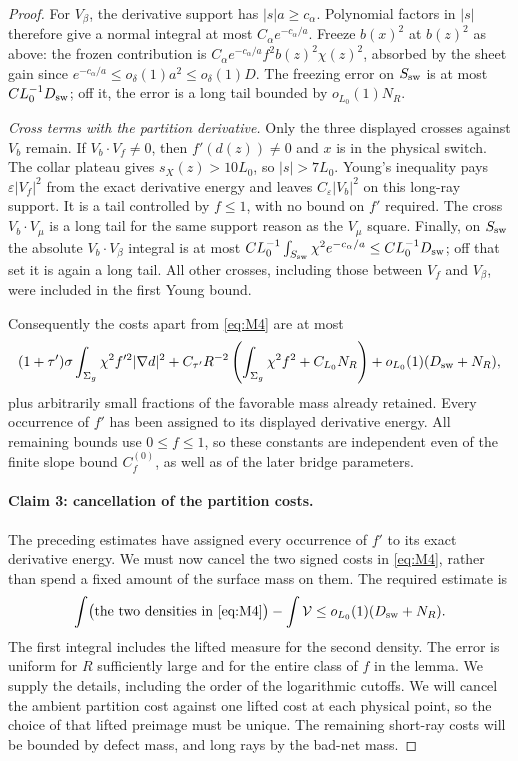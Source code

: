 \begin{proof}
For $V_\beta$, the derivative support has $|s|a\ge c_\alpha$.
Polynomial factors in $|s|$ therefore give a normal integral at most
$C_\alpha e^{-c_\alpha/a}$.  Freeze $b(x)^2$ at $b(z)^2$ as above:
the frozen contribution is
$C_\alpha e^{-c_\alpha/a}f^2b(z)^2\chi(z)^2$, absorbed by the sheet
gain since $e^{-c_\alpha/a}\le o_\delta(1)a^2\le o_\delta(1)D$.
The freezing error on $S_{\rm sw}$ is at most $C L_0^{-1}D_{\rm sw}$;
off it, the error is a long tail bounded by $o_{L_0}(1)N_R$.

\emph{Cross terms with the partition derivative.}
Only the three displayed crosses against $V_b$ remain.  If
$V_b\cdot V_f\ne0$, then $f'(d(z))\ne0$ and $x$ is in the physical
switch.  The collar plateau gives $s_X(z)>10L_0$, so $|s|>7L_0$.
Young's inequality pays $\varepsilon|V_f|^2$ from the exact derivative
energy and leaves $C_\varepsilon|V_b|^2$ on this long-ray support.
It is a tail controlled by $f\le1$, with no bound on $f'$ required.
The cross $V_b\cdot V_\mu$ is a long tail for the same support reason
as the $V_\mu$ square.  Finally, on $S_{\rm sw}$ the absolute
$V_b\cdot V_\beta$ integral is at most
$C L_0^{-1}\int_{S_{\rm sw}}\chi^2e^{-c_\alpha/a}
\le C L_0^{-1}D_{\rm sw}$; off that set it is again a long tail.
All other crosses, including those between $V_f$ and $V_\beta$, were
included in the first Young bound.

Consequently the costs apart from \eqref{eq:M4} are at most
\[
 (1+\tau')\sigma\int_{\Sigma_g}\chi^2f'^2|\nabla d|^2
 +C_{\tau'}R^{-2}
       \left(\int_{\Sigma_g}\chi^2f^2+C_{L_0}N_R\right)
 +o_{L_0}(1)(D_{\rm sw}+N_R),
\]
plus arbitrarily small fractions of the favorable mass already
retained.  Every occurrence of $f'$ has been assigned to its displayed
derivative energy.  All remaining bounds use $0\le f\le1$, so these
constants are independent even of the finite slope bound
$C_f^{(0)}$, as well as of the later bridge parameters.

\paragraph{Claim 3: cancellation of the partition costs.}
The preceding estimates have assigned every occurrence of $f'$ to its
exact derivative energy.  We must now cancel the two signed costs in
\eqref{eq:M4}, rather than spend a fixed amount of the surface mass on
them.  The required estimate is
\begin{equation}\label{eq:M5}
 \int\bigl(\hbox{the two densities in \eqref{eq:M4}}\bigr)
        -\int\mathcal V
 \le o_{L_0}(1)(D_{\rm sw}+N_R).
\end{equation}
The first integral includes the lifted measure for the second density.
The error is uniform for $R$ sufficiently large and for the entire
class of $f$ in the lemma.  We supply the details, including the order
of the logarithmic cutoffs.
We will cancel the ambient partition cost against one lifted cost at
each physical point, so the choice of that lifted preimage must be
unique.  The remaining short-ray costs will be bounded by defect mass,
and long rays by the bad-net mass.


\end{proof}
